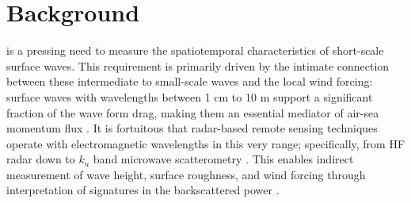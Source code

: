 \documentclass[letterpaper,journal]{IEEEtran}
\begin{document}
	\IEEEpeerreviewmaketitle
	
	\section{Background}
	\label{sec:intro}
	 is a pressing need to measure the spatiotemporal characteristics of short-scale surface waves. This requirement is primarily driven by the intimate connection between these intermediate to small-scale waves and the local wind forcing: surface waves with wavelengths between 1 cm to 10 m support a significant fraction of the wave form drag, making them an essential mediator of air-sea momentum flux \cite{Makin1995}. It is fortuitous that radar-based remote sensing techniques operate with electromagnetic wavelengths in this very range; specifically, from HF radar down to $k_u$ band microwave scatterometry \cite{plant_bragg_1990}. This enables indirect measurement of wave height, surface roughness, and wind forcing through interpretation of signatures in the backscattered power \cite{morales-marquez_hf_2025}.
	
\end{document}
